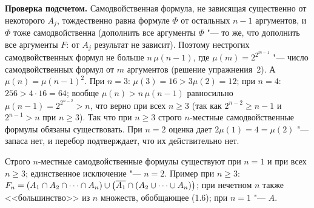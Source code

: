 \begin{solution}[4 (\S\,3)]
\textbf{Проверка подсчетом.} Самодвойственная формула, не зависящая
существенно от некоторого $A_j$, тождественно равна формуле $\Phi$ от
остальных $n-1$ аргументов, и $\Phi$ тоже самодвойственна (дополнить все
аргументы $\Phi$ "--- то же, что дополнить все аргументы $F$: от $A_j$
результат не зависит). Поэтому нестрогих самодвойственных формул не больше
$n\,\mu(n-1)$, где $\mu(m)=2^{2^{m-1}}$ "--- число самодвойственных формул
от $m$ аргументов (решение упражнения~2). А $\mu(n)=\mu(n-1)^2$. При $n=3$:
$\mu(3)=16>3\mu(2)=12$; при $n=4$: $256>4\cdot16=64$; вообще
$\mu(n)>n\,\mu(n-1)$ равносильно $\mu(n-1)=2^{2^{n-2}}>n$, что верно при
всех $n\ge3$ (так как $2^{n-2}\ge n-1$ и $2^{n-1}>n$ при $n\ge3$). Так что
при $n\ge3$ строго $n$-местные самодвойственные формулы обязаны
существовать. При $n=2$ оценка дает $2\mu(1)=4=\mu(2)$ "--- запаса нет,
и перебор подтверждает, что их действительно нет.

\answer Строго $n$-местные самодвойственные формулы существуют при $n=1$
и при всех $n\ge3$; единственное исключение "--- $n=2$. Пример при
$n\ge3$: $F_n=(A_1\cap A_2\cap\dots\cap A_n)\cup\bigl(\overline{A_1}\cap(A_2\cup
\dots\cup A_n)\bigr)$; при нечетном $n$ также <<большинство>> из $n$
множеств, обобщающее (1.6); при $n=1$ "--- $A$.
\end{solution}

